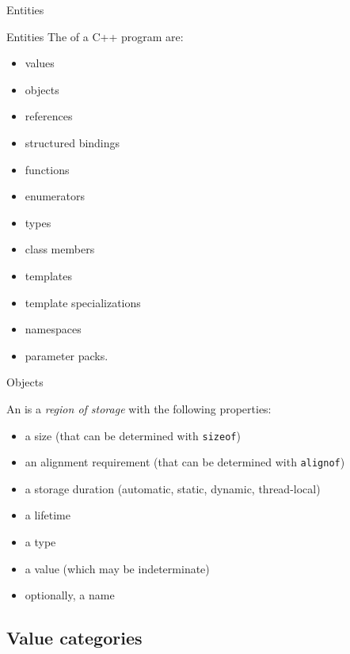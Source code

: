 \begin{frame}{Entities}{}
  \begin{block}{Entities}
    The  of a C++ program are:
    \begin{itemize}
    \item
      values
    \item
      objects
    \item
      references
    \item
      structured bindings
    \item
      functions
    \item
      enumerators
    \item
      types
    \item
      class members
    \item
      templates
    \item
      template specializations
    \item
      namespaces
    \item
      parameter packs.
    \end{itemize}
  \end{block}
\end{frame}

\begin{frame}{Objects}{}
  \begin{definition}[Object]
    An  is a \emph{region of storage} with the following properties:
    \begin{itemize}
    \item
      a size (that can be determined with \lstinline!sizeof!)
    \item
      an alignment requirement (that can be determined with \lstinline!alignof!)
    \item
      a storage duration (automatic, static, dynamic, thread-local)
    \item
      a lifetime
    \item
      a type
    \item
      a value (which may be indeterminate)
    \item
      optionally, a name
    \end{itemize}
  \end{definition}
\end{frame}


\subsection{Value categories}

